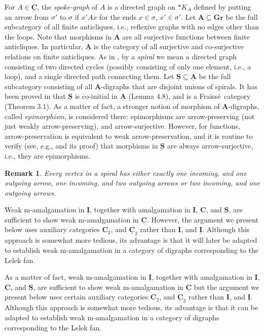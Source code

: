\documentclass[12pt]{amsart}
\numberwithin{equation}{section}
\theoremstyle{plain}
\newtheorem{remark}[theorem]{\bf Remark}
\theoremstyle{definition}
\newcommand \fra{Fra\"{i}ss\'{e}}
\newcommand \AAb{\mathbf{A}}
\newcommand \CCb{\mathbf{C}}
\newcommand \GGRb{\mathbf{Gr}}
\newcommand \IIb{\mathbf{I}}
\newcommand \SSb{\mathbf{S}}
\newcommand \AAub{\underline{\mathbf{A}}}
\newcommand \CCub{\underline{\mathbf{C}}}
\newcommand \IIub{\underline{\mathbf{I}}}
\newcommand \SSub{\underline{\mathbf{S}}}
\begin{document}
For $A \in\CCub$, the \emph{spoke-graph} of $A$ is a directed graph on $*K_A$ defined by putting an arrow from $\sigma'$ to $\sigma$ if $x' A x$ for the ends $x \in \sigma$, $x' \in \sigma'$.  Let $\AAb \subseteq \GGRb$ be the full subcategory of all finite anticliques, i.e., reflexive graphs with no edges other than the loops. Note that morphisms in $\AAb$ are all surjective functions between finite anticliques. In particular, $\AAub$ is the category of all surjective and co-surjective relations on finite anticliques. As in \cite{Kw}, by a \emph{spiral} we mean a directed graph consisting of two directed cycles (possibly consisting of only one element, i.e., a loop), and a single directed path connecting them.  Let $\SSub \subseteq \AAub$ be the full subcategory consisting of all $\AAb$-digraphs that are disjoint unions of spirals. It has been proved in \cite{Kw} that $\SSub$ is co-initial in $\AAub$ (Lemma 4.8), and is a \fra \ category (Theorem 3.1). As a matter of fact,  a stronger notion of morphism of $\AAb$-digraphs, called \emph{epimorphism}, is considered there: epimorphisms are arrow-preserving (not just weakly arrow-preserving), and arrow-surjective. However, for functions, arrow-preservation is equivalent to weak arrow-preservation, and it is routine to verify (see, e.g., \cite[Proposition 3.3]{Kw} and its proof) that morphisms in $\SSub$ are always arrow-surjective, i.e., they are epimorphisms.

\begin{remark}
\label{re:SpiralStructure}
 Every vertex in a spiral has either exactly one incoming, and one outgoing arrow, one incoming, and two outgoing arrows or two incoming, and one outgoing arrows.
\end{remark}

Weak m-amalgamation in $\IIub$, together with amalgamation in $\IIb$, $\CCb$, and $\SSb$, are sufficient to show weak m-amalgamation in $\CCub$. However, the argument we present below uses auxiliary categories $\CCb_2$, and $\CCub_2$ rather than $\IIb$, and $\IIub$. Although this approach is somewhat more tedious, its advantage is that it will later be adapted to establish weak m-amalgamation in a category of digraphs corresponding to the Lelek fan.

As a matter of fact, weak m-amalgamation in $\IIub$, together with amalgamation in $\IIb$, $\CCb$, and $\SSb$, are sufficient to show weak m-amalgamation in $\CCub$ but the argument we present below uses certain auxiliary categories $\CCb_2$, and $\CCub_2$ rather than $\IIb$, and $\IIub$. Although this approach is somewhat more tedious, its advantage is that it can be adapted to establish weak m-amalgamation in a category of digraphs corresponding to the Lelek fan.
\end{document}
